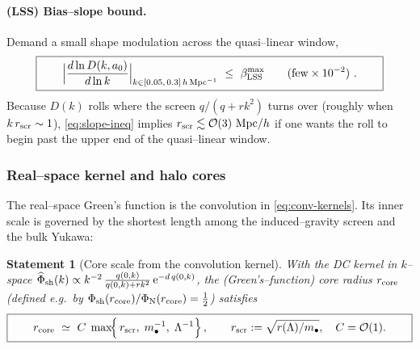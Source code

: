 \documentclass[10pt]{article}
\theoremstyle{definition}
\theoremstyle{plain}
\newtheorem{statement}{Statement}[section]
\begin{document}
\paragraph{(LSS) Bias–slope bound.}\label{par:uom-main-177}
Demand a small shape modulation across the quasi–linear window,
\begin{equation}\label{eq:slope-ineq}
\boxed{\qquad \Bigl|\frac{d\ln D(k,a_0)}{d\ln k}\Bigr|_{k\in[0.05,\,0.3]\,h\,\mathrm{Mpc}^{-1}}\ \le\ \beta_{\rm LSS}^{\max}\qquad (\text{few}\times 10^{-2})\ .\qquad}
\end{equation}
Because $D(k)$ rolls where the screen $q/(q+r k^2)$ turns over (roughly when $k\,r_{\rm scr}\sim 1$), \eqref{eq:slope-ineq}
implies $r_{\rm scr}\lesssim \mathcal O(3)\ \mathrm{Mpc}/h$ if one wants the roll to begin past the upper end of the quasi–linear window.


\subsubsection*{Real–space kernel and halo cores}\label{subsubsec:uom-main-019}

The real–space Green’s function is the convolution in \eqref{eq:conv-kernels}. Its inner scale is governed by the shortest
length among the induced–gravity screen and the bulk Yukawa:
\begin{statement}[Core scale from the convolution kernel]\label{prop:kernel-real}
With the DC kernel in $k$–space 
$\widehat{\Phi}_{\rm sh}(k)\propto k^{-2}\,\frac{q(0,k)}{q(0,k)+r k^2}\,\mathrm{e}^{-d\,q(0,k)}$,
the (Green’s–function) core radius $r_{\rm core}$ (defined e.g.\ by $\Phi_{\rm sh}(r_{\rm core})/\Phi_{\rm N}(r_{\rm core})=\tfrac12$)
satisfies
\begin{equation}\label{eq:rcore-max}
\boxed{\qquad
r_{\rm core}\ \simeq\ C\;\max\!\Bigl\{\,r_{\rm scr},\;m_\bullet^{-1},\;\Lambda^{-1}\Bigr\}\,,\qquad
r_{\rm scr}:=\sqrt{r(\Lambda)/m_\bullet},\quad C=\mathcal O(1).
\qquad}
\end{equation}
\end{statement}
\end{document}
